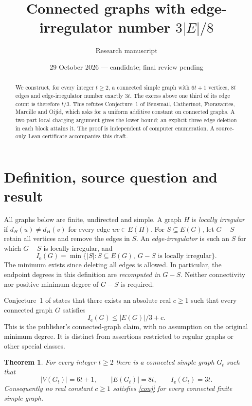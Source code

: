 \documentclass[11pt]{article}
\title{\large Connected graphs with edge-irregulator number\texorpdfstring{ $3|E|/8$}{ 3|E|/8}}
\author{Research manuscript}
\date{29 October 2026 --- candidate; final review pending}
\newtheorem{theorem}{Theorem}
\newcommand{\Ie}{I_{\mathrm e}}
\begin{document}
\maketitle
\begin{abstract}
We construct, for every integer $t\ge2$, a connected simple graph with
$6t+1$ vertices, $8t$ edges and edge-irregulator number exactly $3t$.
The excess above one third of its edge count is therefore $t/3$.
This refutes Conjecture~1 of Bensmail, Catherinot, Fioravantes, Marcille
and Oijid, which asks for a uniform additive constant on connected graphs.
A two-part local charging argument gives the lower bound; an explicit
three-edge deletion in each block attains it. The proof is independent of
computer enumeration. A source-only Lean certificate accompanies this draft.
\end{abstract}

\section{Definition, source question and result}
All graphs below are finite, undirected and simple. A graph $H$ is
\emph{locally irregular} if $d_H(u)\ne d_H(v)$ for every edge $uv\in E(H)$.
For $S\subseteq E(G)$, let $G-S$ retain all vertices and remove the edges
in $S$. An \emph{edge-irregulator} is such an $S$ for which $G-S$ is locally
irregular, and
\[
 \Ie(G)=\min\{|S|:S\subseteq E(G),\ G-S\text{ is locally irregular}\}.
\]
The minimum exists since deleting all edges is allowed. In particular, the
endpoint degrees in this definition are \emph{recomputed in $G-S$}.
Neither connectivity nor positive minimum degree of $G-S$ is required.

Conjecture~1 of \cite[p.~356]{source} states that there exists an absolute
real $c\ge1$ such that every connected graph $G$ satisfies
\begin{equation}\label{conj}
 \Ie(G)\le |E(G)|/3+c.
\end{equation}
This is the publisher's connected-graph claim, with no assumption on the
original minimum degree. It is distinct from assertions restricted to
regular graphs or other special classes.

\begin{theorem}\label{main}
For every integer $t\ge2$ there is a connected simple graph $G_t$ such that
\[
 |V(G_t)|=6t+1,\qquad |E(G_t)|=8t,\qquad \Ie(G_t)=3t.
\]
Consequently no real constant $c\ge1$ satisfies \eqref{conj} for every
connected finite simple graph.
\end{theorem}
\end{document}
